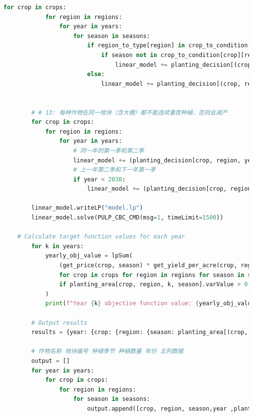 \documentclass{cumcmthesis}
\begin{document}
\begin{appendices}
\begin{lstlisting}[language=python]
        for crop in crops:
            for region in regions:
                for year in years:
                    for season in seasons:
                        if region_to_type[region] in crop_to_condition[crop]:
                            if season not in crop_to_condition[crop][region_to_type[region]]:
                                linear_model += planting_decision[(crop, region, year, season)] == 0
                        else:
                            linear_model += planting_decision[(crop, region, year, season)] == 0
                            
        
        # # 13: 每种作物在同一地块（含大棚）都不能连续重茬种植，否则会减产
        for crop in crops:
            for region in regions:
                for year in years:
                    # 同一年的第一季和第二季
                    linear_model += (planting_decision[crop, region, year, '第一季'] + planting_decision[crop, region, year, '第二季'] <= 1)
                    # 上一年第二季和下一年第一季
                    if year < 2030:
                        linear_model += (planting_decision[crop, region, year, '第二季'] + planting_decision[crop, region, year+1, '第一季'] <= 1)
    
        linear_model.writeLP("model.lp")
        linear_model.solve(PULP_CBC_CMD(msg=1, timeLimit=1500))
    
    # Calculate target function values for each year
        for k in years:
            yearly_obj_value = lpSum(
                (get_price(crop, season) * get_yield_per_acre(crop, region) - get_cost(crop, region)) * planting_area[crop, region, k, season].varValue
                for crop in crops for region in regions for season in seasons
                if planting_area[crop, region, k, season].varValue > 0  # Only consider variables with planting area greater than 0
            )
            print(f"Year {k} objective function value: {yearly_obj_value}")
    
        # Output results
        results = {year: {crop: {region: {season: planting_area[(crop, region, year, season)].varValue for season in seasons} for region in regions} for crop in crops} for year in years}
    
        # 作物名称 地块编号 种植季节 种植数量 年份 五列数据
        output = []
        for year in years:
            for crop in crops:
                for region in regions:
                    for season in seasons:
                        output.append([crop, region, season,year ,planting_area[(crop, region, year, season)].varValue])
    

\end{lstlisting}
\end{appendices}
\end{document}
